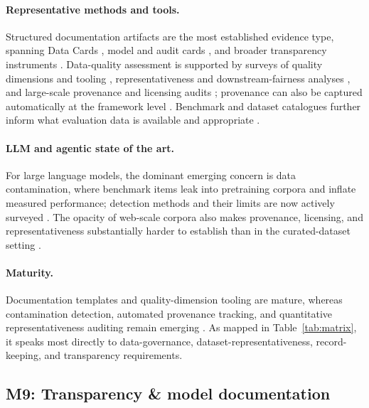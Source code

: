 \paragraph{Representative methods and tools.} Structured documentation artifacts are the most established evidence type, spanning Data Cards \cite{pushkarna2022datacards}, model and audit cards \cite{liang2024whatsdocumented,staufer2025auditcards}, and broader transparency instruments \cite{raffel2024transparency,winecoff2024governance}. Data-quality assessment is supported by surveys of quality dimensions and tooling \cite{pan2024metrics}, representativeness and downstream-fairness analyses \cite{liang2024representativeness}, and large-scale provenance and licensing audits \cite{luccioni2023dataprovenance}; provenance can also be captured automatically at the framework level \cite{pocock2021tribuo}. Benchmark and dataset catalogues further inform what evaluation data is available and appropriate \cite{ivanov2024benchmarks}.

\paragraph{LLM and agentic state of the art.} For large language models, the dominant emerging concern is data contamination, where benchmark items leak into pretraining corpora and inflate measured performance; detection methods and their limits are now actively surveyed \cite{lukoševičius2024contamination}. The opacity of web-scale corpora also makes provenance, licensing, and representativeness substantially harder to establish than in the curated-dataset setting \cite{luccioni2023dataprovenance,nist2024genai}.

\paragraph{Maturity.} Documentation templates and quality-dimension tooling are mature, whereas contamination detection, automated provenance tracking, and quantitative representativeness auditing remain emerging \cite{global2024governance}. As mapped in Table~\ref{tab:matrix}, it speaks most directly to data-governance, dataset-representativeness, record-keeping, and transparency requirements.

\subsection{M9: Transparency \& model documentation}
\label{subsec:m9}


